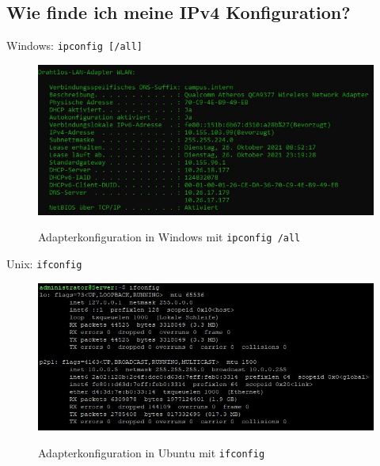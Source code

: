 \subsection*{Wie finde ich meine IPv4 Konfiguration?}
\begin{multicols}{2}
    Windows: \texttt{ipconfig [/all]}
    \begin{figure}[H]
        \begin{center}
        \label{pic:ipconfig}
        \includegraphics[width=.5\textwidth]{images/ipconfig.jpg}
        \caption{Adapterkonfiguration in Windows mit \texttt{ipconfig /all}}
        \end{center}
    \end{figure}
    \columnbreak
    Unix: \texttt{ifconfig}
    \begin{figure}[H]
        \begin{center}
        \label{pic:ifconfig}
        \includegraphics[width=.5\textwidth]{images/ifconfig.jpg}
        \caption{Adapterkonfiguration in Ubuntu mit \texttt{ifconfig}}
        \end{center}
    \end{figure}
\end{multicols}

